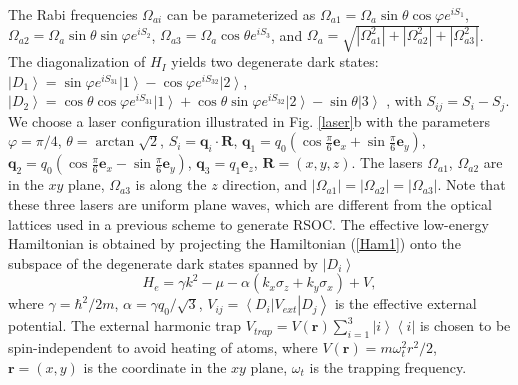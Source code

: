 \documentclass[pra,twocolumn,showpacs,floatfix]{revtex4-1}
\begin{document}
The Rabi frequencies $\Omega _{ai}$ can be parameterized as $\Omega
_{a1}=\Omega _{a}\sin \theta \cos \varphi e^{iS_{1}}$, $\Omega _{a2}=\Omega
_{a}\sin \theta \sin \varphi e^{iS_{2}}$, $\Omega _{a3}=\Omega _{a}\cos
\theta e^{iS_{3}}$, and $\Omega _{a}=\sqrt{\left\vert \Omega
_{a1}^{2}\right\vert +\left\vert \Omega _{a2}^{2}\right\vert +\left\vert
\Omega _{a3}^{2}\right\vert }$. The diagonalization of $H_{I}$ yields two
degenerate dark states: $\left\vert D_{1}\right\rangle =\sin \varphi
e^{iS_{31}}\left\vert 1\right\rangle -\cos \varphi e^{iS_{32}}\left\vert
2\right\rangle $, $\left\vert D_{2}\right\rangle =\cos \theta \cos \varphi
e^{iS_{31}}\left\vert 1\right\rangle +\cos \theta \sin \varphi
e^{iS_{32}}\left\vert 2\right\rangle -\sin \theta \left\vert 3\right\rangle $%
, with $S_{ij}=S_{i}-S_{j}$. We choose a laser configuration illustrated in
Fig. \ref{laser}b with the parameters $\varphi =\pi /4$, $\theta =\arctan
\sqrt{2}$, $S_{i}=\mathbf{q}_{i}\cdot \mathbf{R}$, $\mathbf{q}%
_{1}=q_{0}\left( \cos \frac{\pi }{6}\mathbf{e}_{x}+\sin \frac{\pi }{6}%
\mathbf{e}_{y}\right) $, $\mathbf{q}_{2}=q_{0}\left( \cos \frac{\pi }{6}%
\mathbf{e}_{x}-\sin \frac{\pi }{6}\mathbf{e}_{y}\right) $, $\mathbf{q}%
_{3}=q_{1}\mathbf{e}_{z}$, $\mathbf{R}=\left( x,y,z\right) $. The lasers $%
\Omega _{a1}$, $\Omega _{a2}$ are in the $xy$ plane, $\Omega _{a3}$ is along
the $z$ direction, and $\left\vert \Omega _{a1}\right\vert =\left\vert
\Omega _{a2}\right\vert =\left\vert \Omega _{a3}\right\vert $. Note that
these three lasers are uniform plane waves, which are different from the
optical lattices used in a previous scheme \cite{Zhang} to generate RSOC.
The effective low-energy Hamiltonian is obtained by projecting the
Hamiltonian (\ref{Ham1}) onto the subspace of the degenerate dark states
spanned by $\left\vert D_{i}\right\rangle $
\begin{equation}
H_{e}=\gamma k^{2}-\mu -\alpha \left( k_{x}\sigma _{z}+k_{y}\sigma
_{x}\right) +V,  \label{Ham2}
\end{equation}%
where $\gamma =\hbar ^{2}/2m$, $\alpha =\gamma q_{0}/\sqrt{3}$, $%
V_{ij}=\left\langle D_{i}\right\vert V_{ext}\left\vert D_{j}\right\rangle $
is the effective external potential. The external harmonic trap $%
V_{trap}=V\left( \mathbf{r}\right) \sum\nolimits_{i=1}^{3}\left\vert
i\right\rangle \left\langle i\right\vert $ is chosen to be spin-independent
to avoid heating of atoms, where $V\left( \mathbf{r}\right) =m\omega
_{t}^{2}r^{2}/2$, $\mathbf{r}=\left( x,y\right) $ is the coordinate in the $%
xy$ plane, $\omega _{t}$ is the trapping frequency.
\end{document}
